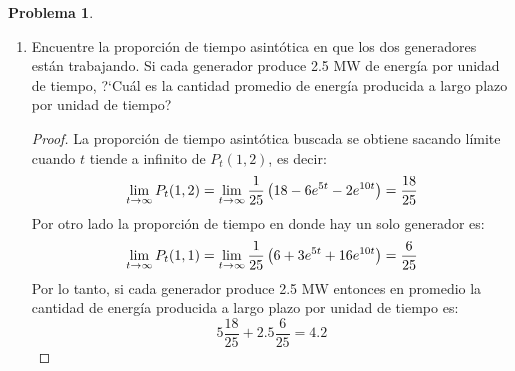 \documentclass[a5paper,oneside]{amsart}
\theoremstyle{plain}
\theoremstyle{definition}
\newtheorem{problema}{Problema}
\begin{document}
\begin{problema}
\begin{enumerate}
\begin{proof}
\end{proof}
\item Encuentre la proporci\'on de tiempo asint\'otica en que los dos generadores est\'an trabajando. Si cada generador produce 2.5 MW de energ\'ia por unidad de tiempo, ?`Cu\'al es la cantidad promedio de energ\'ia producida a largo plazo por unidad de tiempo?
\begin{proof}
La proporci\'on de tiempo asint\'otica buscada  se obtiene sacando l\'imite cuando $t$ tiende a infinito de $P_t(1,2)$, es decir:
$$
\lim_{t \rightarrow \infty}P_t(1,2)=\lim_{t \rightarrow \infty}\frac{1}{25}\left( 18-6e^{5t}-2e^{10t}\right) =\frac{18}{25}
$$
Por otro lado la proporci\'on de tiempo en donde hay un solo generador es:
$$
\lim_{t \rightarrow \infty}P_t(1,1)=\lim_{t \rightarrow \infty}\frac{1}{25}\left( 6+3e^{5t}+16e^{10t}\right) =\frac{6}{25}
$$
Por lo tanto, si cada generador produce 2.5 MW entonces en promedio la cantidad de energ\'ia producida a largo plazo por unidad de tiempo es:
$$
5\frac{18}{25}+2.5\frac{6}{25}=4.2
$$
\end{proof}
\end{enumerate}
\end{problema}
\end{document}
